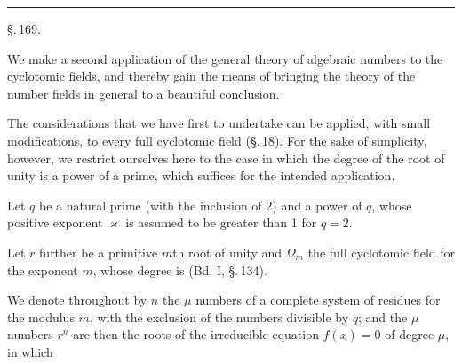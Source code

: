 
\begin{center}

\end{center}

\begin{center}
\rule{4cm}{0.4pt}
\end{center}

\begin{center}
\S.\,169.

\end{center}

We make a second application of the general theory of algebraic numbers to the cyclotomic fields, and thereby gain the means of bringing the theory of the  number fields in general to a beautiful conclusion.

The considerations that we have first to undertake can be applied, with small modifications, to every full cyclotomic field (\S.\,18). For the sake of simplicity, however, we restrict ourselves here to the case in which the degree of the root of unity is a power of a prime, which suffices for the intended application.

Let $q$ be a natural prime (with the inclusion of 2) and
a power of $q$, whose positive exponent $\varkappa$ is assumed to be greater than 1 for $q=2$.

Let $r$ further be a primitive $m$th root of unity and $\Omega_m$ the full cyclotomic field for the exponent $m$, whose degree is
(Bd. I, \S.\,134).

We denote throughout by $n$ the $\mu$ numbers of a complete system of residues for the modulus $m$, with the exclusion of the numbers divisible by $q$; and the $\mu$ numbers $r^n$ are then the roots of the irreducible equation $f(x)=0$ of degree $\mu$, in which
